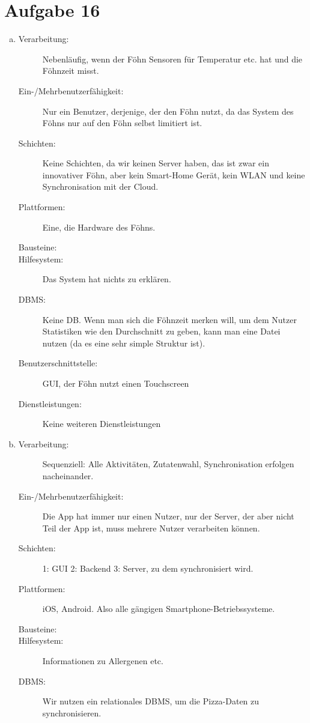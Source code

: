\section*{Aufgabe 16}
\begin{enumerate} [a)]
	\item 
	\begin{description}
		\item[Verarbeitung:] Nebenläufig, wenn der Föhn Sensoren für Temperatur etc. hat und die Föhnzeit misst.
		\item[Ein-/Mehrbenutzerfähigkeit:] Nur ein Benutzer, derjenige, der den Föhn nutzt, da das System des Föhns nur auf den Föhn selbst limitiert ist.
		\item[Schichten:] Keine Schichten, da wir keinen Server haben, das ist zwar ein innovativer Föhn, aber kein Smart-Home Gerät, kein WLAN und keine Synchronisation mit der Cloud.
		\item[Plattformen:] Eine, die Hardware des Föhns.
		\item[Bausteine:] 
		\item[Hilfesystem:] Das System hat nichts zu erklären.
		\item[DBMS:] Keine DB. Wenn man sich die Föhnzeit merken will, um dem Nutzer Statistiken wie den Durchschnitt zu geben, kann man eine Datei nutzen (da es eine sehr simple Struktur ist).
		\item[Benutzerschnittstelle:] GUI, der Föhn nutzt einen Touchscreen
		\item[Dienstleistungen:] Keine weiteren Dienstleistungen
	\end{description}
	\item 
		\begin{description}
		\item[Verarbeitung:] Sequenziell: Alle Aktivitäten, Zutatenwahl, Synchronisation erfolgen nacheinander.
		\item[Ein-/Mehrbenutzerfähigkeit:] Die App hat immer nur einen Nutzer, nur der Server, der aber nicht Teil der App ist, muss mehrere Nutzer verarbeiten können.
		\item[Schichten:] 1: GUI 2: Backend 3: Server, zu dem synchronisiert wird.
		\item[Plattformen:] iOS, Android. Also alle gängigen Smartphone-Betriebssysteme.
		\item[Bausteine:]
		\item[Hilfesystem:] Informationen zu Allergenen etc.
		\item[DBMS:] Wir nutzen ein relationales DBMS, um die Pizza-Daten zu synchronisieren.

\end{description}
\end{enumerate}
